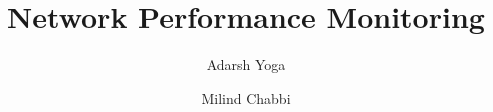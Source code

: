 \documentclass{llncs}
\begin{document}
\title{Network Performance Monitoring} %

\author{Adarsh Yoga \and Milind Chabbi}



\maketitle









\end{document}
